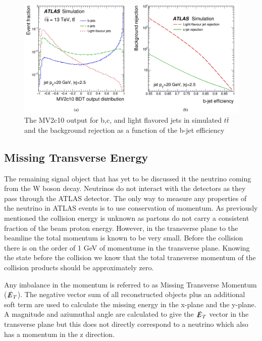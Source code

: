 \begin{figure}[h!]
	\centering
	\includegraphics[width=\columnwidth]{../ThesisImages/Simulation/BTagMV2c10andRejVsEff.png}
	\caption[The MV2c10 output for b,c, and light flavored jets in simulated $t\bar{t}$ and the background rejection as a function of the b-jet efficiency]{The MV2c10 output for b,c, and light flavored jets in simulated $t\bar{t}$ and the background rejection as a function of the b-jet efficiency \cite{BJetMVA}
	}
	\label{fig:BTag}
\end{figure}


\label{sec:bjetReco}

\subsection{Missing Transverse Energy}
The remaining signal object that has yet to be discussed it the neutrino coming from the W boson decay.  Neutrinos do not interact with the detectors as they pass through the ATLAS detector.  The only way to measure any properties of the neutrino in ATLAS events is to use conservation of momentum.  As previously mentioned the collision energy is unknown as partons do not carry a consistent fraction of the beam proton energy.  However, in the transverse plane to the beamline the total momentum is known to be very small.  Before the collision there is on the order of 1 GeV of momentume in the transverse plane.  Knowing the state before the collision we know that the total transverse momentum of the collision products should be approximately zero.

Any imbalance in the momentum is referred to as Missing Transverse Momentum ($\slashed{E}_T$).  The negative vector sum of all reconstructed objects plus an additional soft term are used to calculate the missing energy in the x-plane and the y-plane\cite{METreco}.  A magnitude and aziumuthal angle are calculated to give the \textbf{$\slashed{E}_T$} vector in the transverse plane but this does not directly correspond to a neutrino which also has a momentum in the z direction.

